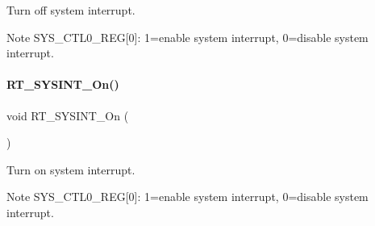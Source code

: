 Turn off system interrupt. 

\begin{DoxyNote}{Note}
S\+Y\+S\+\_\+\+C\+T\+L0\+\_\+\+R\+EG\mbox{[}0\mbox{]}\+: 1=enable system interrupt, 0=disable system interrupt. 
\end{DoxyNote}
\mbox{\label{a00011_ae38d9088d19c0550caf1dacec0b3475b}} 
\paragraph{\texorpdfstring{R\+T\+\_\+\+S\+Y\+S\+I\+N\+T\+\_\+\+On()}{RT\_SYSINT\_On()}}
{\footnotesize\ttfamily void R\+T\+\_\+\+S\+Y\+S\+I\+N\+T\+\_\+\+On (\begin{DoxyParamCaption}{ }\end{DoxyParamCaption})\hspace{0.3cm}{\ttfamily [inline]}}



Turn on system interrupt. 

\begin{DoxyNote}{Note}
S\+Y\+S\+\_\+\+C\+T\+L0\+\_\+\+R\+EG\mbox{[}0\mbox{]}\+: 1=enable system interrupt, 0=disable system interrupt. 
\end{DoxyNote}
